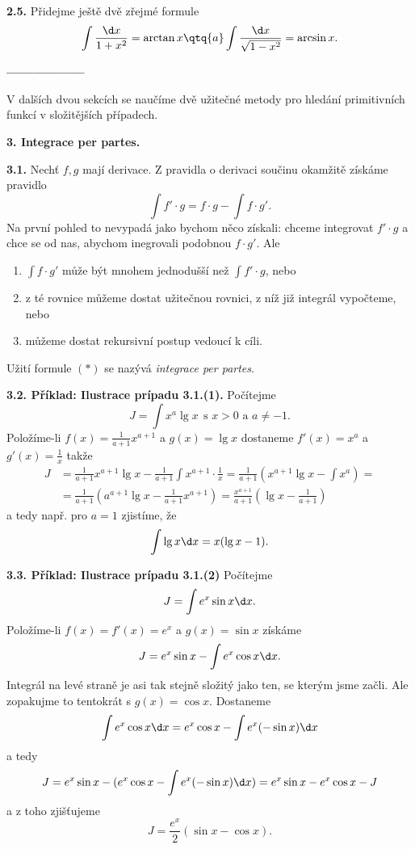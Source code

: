 \documentclass[12pt]{article}
\begin{document}
{  
  \bigskip
  
  {\bf 2.5.} Přidejme ještě dvě zřejmé formule
  $$
  \int\frac{\d x}{1+x^2}=\arctan x \qtq{a} \int\frac{\d x}{\sqrt{1-x^2}}=\arcsin x.
  $$
  
  
  \vskip5mm
  
  \centerline{\bf ------------------}
  
  \vskip5mm
  
  V dalších dvou  sekcích se naučíme dvě užitečné metody pro hledání primitivních funkcí v složitějších případech.
  
  \vskip10mm
 
 {\large\bf 3. Integrace per partes.}
 
  
 \bigskip
 
 {\bf 3.1.} Nechť $f,g$ mají derivace. Z pravidla o derivaci součinu okamžitě získáme pravidlo
 \begin{equation}
 \int f'\cdot g= f\cdot g -\int f\cdot g'. \tag{$*$}
 \end{equation}
Na první pohled to nevypadá jako bychom něco získali: chceme integrovat $f'\cdot g$ a chce se od nas, abychom inegrovali podobnou $f\cdot g'$.
 Ale
 \begin{enumerate}
 \item $\int f\cdot g'$ může být mnohem jednodušší než $\int f'\cdot g$, nebo
 \item z té rovnice můžeme dostat užitečnou rovnici, z níž již integrál vypočteme,
 nebo 
 \item můžeme dostat rekursivní postup vedoucí k cíli.
 \end{enumerate} 
 Užití formule $(*)$ se nazývá {\em integrace per partes}.
 
 \bigskip
 
 {\bf 3.2. Příklad: Ilustrace prípadu 3.1.(1).} Počítejme
 $$
 J=\int x^a \lg x \ \ \text{s $x>0$ a $a\neq -1$}.
 $$
 Položíme-li $f(x)=\frac{1}{a+1}x^{a+1}$ a $g(x)=\lg x$ dostaneme $f'(x)=x^a$ a $g'(x)=\frac{1}{x}$ takže
 $$
 \begin{aligned}
 J&=\frac{1}{a+1}x^{a+1}\lg x-\frac{1}{a+1}\int x^{a+1}\cdot\frac{1}{x}=
 \frac{1}{a+1}(x^{a+1}\lg x-\int x^a)=\\
  &=\frac{1}{a+1}(a^{a+1}\lg x-\frac{1}{a+1} x^{a+1})=
  \frac{x^{a+1}}{a+1}(\lg x-\frac{1}{a+1})
 \end{aligned} 
 $$
 a tedy např. pro $a=1$  zjistíme, že 
$$
 \int\lg x\d x= x(\lg x-1).
 $$
 
 \bigskip
 
 {\bf 3.3. Příklad: Ilustrace prípadu 3.1.(2)} Počítejme
 $$
 J=\int e^x\sin x\d x.
 $$
 Položíme-li $f(x)=f'(x)=e^x$ a $g(x)=\sin x$ získáme
 $$
 J=e^x\sin x-\int e^x\cos x\d x.
 $$
 Integrál na levé straně je asi tak stejně složitý jako ten, se kterým jsme začli. Ale zopakujme to tentokrát s $g(x)=\cos x$. Dostaneme
 $$
 \int e^x\cos x\d x=e^x\cos x-\int e^x(-\sin x)\d x
 $$
 a tedy
 $$
 J=e^x\sin x-(e^x\cos x-\int e^x(-\sin x)\d x)=e^x\sin x-e^x\cos x-J
 $$
 a z toho zjišťujeme
 $$
 J=\frac{e^x}{2}(\sin x-\cos x).
 $$
 
}
\end{document}
